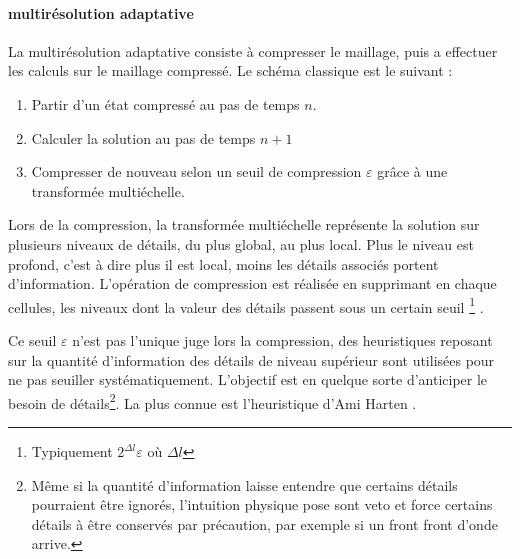         \paragraph{multirésolution adaptative}
            La multirésolution adaptative consiste à compresser le maillage, puis a effectuer les calculs sur le maillage compressé.
            Le schéma classique est le suivant : 
            \begin{enumerate}
                \item Partir d'un état compressé au pas de temps $n$.
                \item Calculer la solution au pas de temps $n+1$
                \item Compresser de nouveau selon un seuil de compression $\varepsilon$ grâce à une transformée multiéchelle.
            \end{enumerate}
            Lors de la compression, la transformée multiéchelle représente la solution sur plusieurs niveaux de détails, du plus global, au plus local.
            Plus le niveau est profond, c'est à dire plus il est local, moins les détails associés portent d'information. 
            L'opération de compression est réalisée en supprimant en chaque cellules, les niveaux dont la valeur des détails
            passent sous un certain seuil \footnote{Typiquement $2^{\Delta l} \varepsilon$ où ${\Delta l}$} \cite{postelApprox} .

            Ce seuil $\varepsilon$ n'est pas l'unique juge lors la compression, des heuristiques reposant sur la quantité d'information des détails de niveau supérieur
            sont utilisées pour ne pas seuiller systématiquement. L'objectif est en quelque sorte d'anticiper le besoin de détails\footnote{Même si la quantité d'information laisse entendre que 
            certains détails pourraient être ignorés, l'intuition physique pose sont veto et force certains détails à être conservés par précaution, par exemple si un front front d'onde arrive.}.
            La plus connue est l'heuristique d'Ami Harten \cite{harten1994}.

